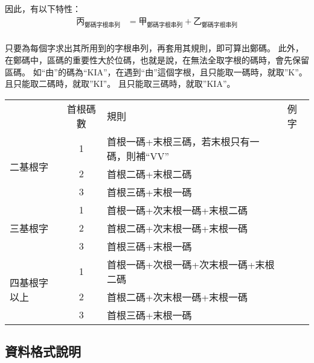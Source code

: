 \documentclass{article}
\begin{document}
因此，有以下特性：
\begin{subequations}
  \begin{align}
  \mbox{丙}_{\mbox{鄭碼字根串列}} &= \mbox{甲}_{\mbox{鄭碼字根串列}} + \mbox{乙}_{\mbox{鄭碼字根串列}} \\
  \end{align}
\end{subequations}

只要為每個字求出其所用到的字根串列，再套用其規則，即可算出鄭碼。
此外，在鄭碼中，區碼的重要性大於位碼，也就是說，在無法全取字根的碼時，會先保留區碼。
如``由''的碼為``KIA''，在遇到``由''這個字根，且只能取一碼時，就取''K''。
且只能取二碼時，就取''KI''。
且只能取三碼時，就取''KIA''。

\begin{tabular}{lcll}
           & 首根碼數 & 規則 & 例字\\
  \multirow{3}{*}{二基根字} & 1 & 首根一碼+末根三碼，若末根只有一碼，則補``VV''\\
  & 2 & 首根二碼+末根二碼\\
  & 3 & 首根三碼+末根一碼\\
  \multirow{3}{*}{三基根字} & 1 & 首根一碼+次末根一碼+末根二碼\\
  & 2 & 首根二碼+次末根一碼+末根一碼\\
  & 3 & 首根三碼+末根一碼\\
  \multirow{4}{*}{四基根字以上} & 1 & 首根一碼+次根一碼+次末根一碼+末根二碼\\
  & 2 & 首根二碼+次末根一碼+末根一碼\\
  & 3 & 首根三碼+末根一碼\\
\end{tabular}

\subsection{資料格式說明}
\end{document}
